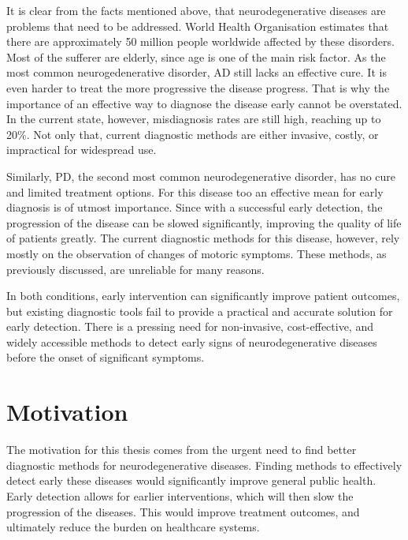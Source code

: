 It is clear from the facts mentioned above, that neurodegenerative diseases are problems that need to be addressed.
World Health Organisation estimates that there are approximately 50 million people worldwide affected by these disorders.
Most of the sufferer are elderly, since age is one of the main risk factor.
As the most common neurogedenerative disorder, \ac{AD} still lacks an effective cure.
It is even harder to treat the more progressive the disease progress.
That is why the importance of an effective way to diagnose the disease early cannot be overstated. 
In the current state, however, misdiagnosis rates are still high, reaching up to 20\%.
Not only that, current diagnostic methods are either invasive, costly, or impractical for widespread use.

Similarly, \ac{PD}, the second most common neurodegenerative disorder, has no cure and limited treatment options. 
For this disease too an effective mean for early diagnosis is of utmost importance.
Since with a successful early detection, the progression of the disease can be slowed significantly, improving the quality of life of patients greatly.
The current diagnostic methods for this disease, however, rely mostly on the observation of changes of motoric symptoms.
These methods, as previously discussed, are unreliable for many reasons.

In both conditions, early intervention can significantly improve patient outcomes, but existing diagnostic tools fail to provide a practical and accurate solution for early detection. 
There is a pressing need for non-invasive, cost-effective, and widely accessible methods to detect early signs of neurodegenerative diseases before the onset of significant symptoms.

\section{Motivation}


The motivation for this thesis comes from the urgent need to find better diagnostic methods for neurodegenerative diseases. 
Finding methods to effectively detect early these diseases would significantly improve general public health.
Early detection allows for earlier interventions, which will then slow the progression of the diseases.
This would improve treatment outcomes, and ultimately reduce the burden on healthcare systems.

